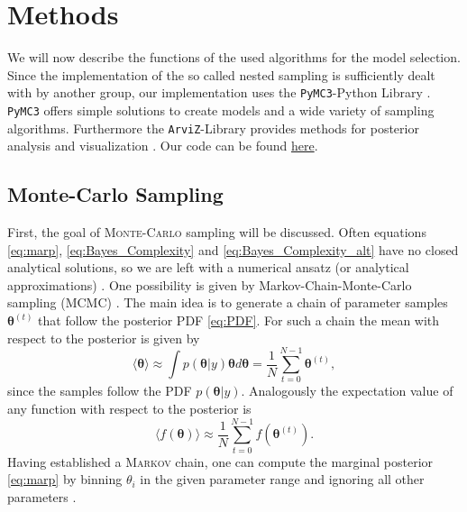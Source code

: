 \documentclass[%
 reprint,
 amsmath,amssymb,
 aps,
]{revtex4-1}
\begin{document}
\section{Methods}\label{sec:meth}
\noindent We will now describe the functions of the used algorithms for the model selection. Since the implementation of the so called nested sampling is sufficiently dealt with by another group,  our implementation uses the \texttt{PyMC3}-Python Library \cite{PyMC3}.  \texttt{PyMC3} offers simple solutions to create models and a wide variety of sampling algorithms. Furthermore the \texttt{ArviZ}-Library provides methods for posterior analysis and visualization \cite{ArviZ}. Our code can be found \hyperref{https://github.com/dschuechter/physics760_schuechter_krause}{Github-Repository}{Bayes model selection}{here}.

 \subsection{Monte-Carlo Sampling}
\noindent First, the goal of \textsc{Monte-Carlo} sampling will be discussed. Often equations \eqref{eq:marp}, \eqref{eq:Bayes_Complexity} and \eqref{eq:Bayes_Complexity_alt} have no closed analytical solutions, so we are left with a numerical ansatz (or analytical approximations) \cite{Toussaint}. One possibility is given by Markov-Chain-Monte-Carlo sampling (MCMC) \cite{Toussaint}. The main idea is to generate a chain of parameter samples $\boldsymbol{\theta}^{(t)}$ that follow the posterior PDF \eqref{eq:PDF}. For such a chain the mean with respect to the posterior is given by 
 \begin{equation}
 	\langle \boldsymbol{\theta}\rangle\approx \int p(\boldsymbol{\theta} | y)\boldsymbol{\theta}d\boldsymbol{\theta}=\frac{1}{N}\sum_{t=0}^{N-1}\boldsymbol{\theta}^{(t)},
 \end{equation}
since the samples follow the PDF $p(\boldsymbol{\theta} | y)$. Analogously the expectation value of any function with respect to the posterior is
 \begin{equation}
	\langle f(\boldsymbol{\theta})\rangle\approx\frac{1}{N}\sum_{t=0}^{N-1}f(\boldsymbol{\theta}^{(t)}).
\end{equation}
Having established a \textsc{Markov} chain, one can compute the marginal posterior \eqref{eq:marp} by binning $\theta_i$ in the given parameter range and ignoring all other parameters \cite{Trotta_2008}. 
\end{document}

